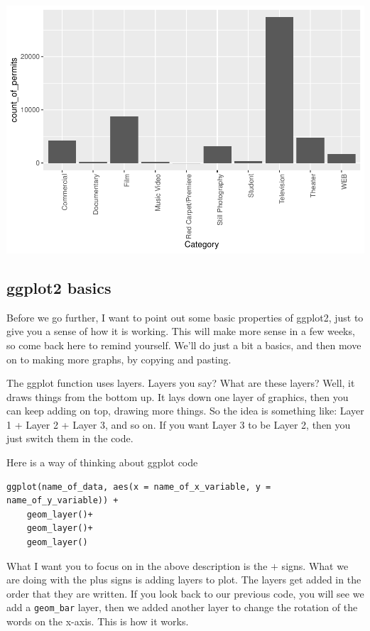 \documentclass[
]{book}
\begin{document}
\includegraphics{Statistics_Lab_files/figure-latex/1categoryB-1.pdf}

\hypertarget{ggplot2-basics}{%
\subsection{ggplot2 basics}\label{ggplot2-basics}}

Before we go further, I want to point out some basic properties of ggplot2, just to give you a sense of how it is working. This will make more sense in a few weeks, so come back here to remind yourself. We'll do just a bit a basics, and then move on to making more graphs, by copying and pasting.

The ggplot function uses layers. Layers you say? What are these layers? Well, it draws things from the bottom up. It lays down one layer of graphics, then you can keep adding on top, drawing more things. So the idea is something like: Layer 1 + Layer 2 + Layer 3, and so on. If you want Layer 3 to be Layer 2, then you just switch them in the code.

Here is a way of thinking about ggplot code

\begin{verbatim}
ggplot(name_of_data, aes(x = name_of_x_variable, y = name_of_y_variable)) +
    geom_layer()+
    geom_layer()+
    geom_layer()
\end{verbatim}

What I want you to focus on in the above description is the \(+\) signs. What we are doing with the plus signs is adding layers to plot. The layers get added in the order that they are written. If you look back to our previous code, you will see we add a \texttt{geom\_bar} layer, then we added another layer to change the rotation of the words on the x-axis. This is how it works.
\end{document}
